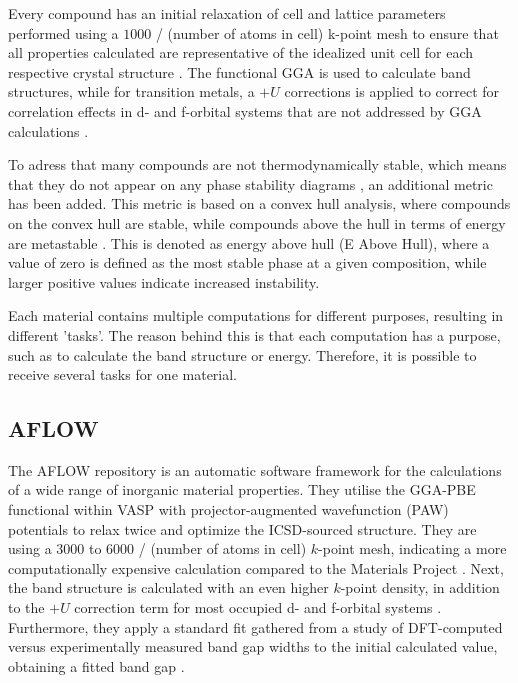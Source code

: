 
Every compound has an initial relaxation of cell and lattice parameters performed using a $1000$ / (number of atoms in cell) k-point mesh to ensure that all properties calculated are representative of the idealized unit cell for each respective crystal structure \cite{Ferrenti2020}. The functional GGA is used to calculate band structures, while for transition metals, a $+U$ corrections is applied to correct for correlation effects in d- and f-orbital systems that are not addressed by GGA calculations \cite{Wang2006}.

To adress that many compounds are not thermodynamically stable, which means that they do not appear on any phase stability diagrams \cite{Sun2016}, an additional metric has been added. This metric is based on a convex hull analysis, where compounds on the convex hull are stable, while compounds above the hull in terms of energy are metastable \cite{Jain2018}. This is denoted as energy above hull (E Above Hull), where a value of zero is defined as the most stable phase at a given composition, while larger positive values indicate increased instability.

Each material contains multiple computations for different purposes, resulting in different 'tasks'. The reason behind this is that each computation has a purpose, such as to calculate the band structure or energy. Therefore, it is possible to receive several tasks for one material.

\subsection{AFLOW}

The AFLOW\cite{Curtarolo2012, Curtarolo2012a, Calderon2015} repository is an automatic software framework for the calculations of a wide range of inorganic material properties. They utilise the GGA-PBE functional within VASP with projector-augmented wavefunction (PAW) potentials to relax twice and optimize the ICSD-sourced structure. They are using a $3000$ to $6000$ / (number of atoms in cell) $k$-point mesh, indicating a more computationally expensive calculation compared to the Materials Project \cite{Ferrenti2020}. Next, the band structure is calculated with an even higher $k$-point density, in addition to the $+U$ correction term for most occupied d- and f-orbital systems \cite{Setyawan2010}. Furthermore, they apply a standard fit gathered from a study of DFT-computed versus experimentally measured band gap widths to the initial calculated value, obtaining a fitted band gap \cite{Setyawan2011}.

